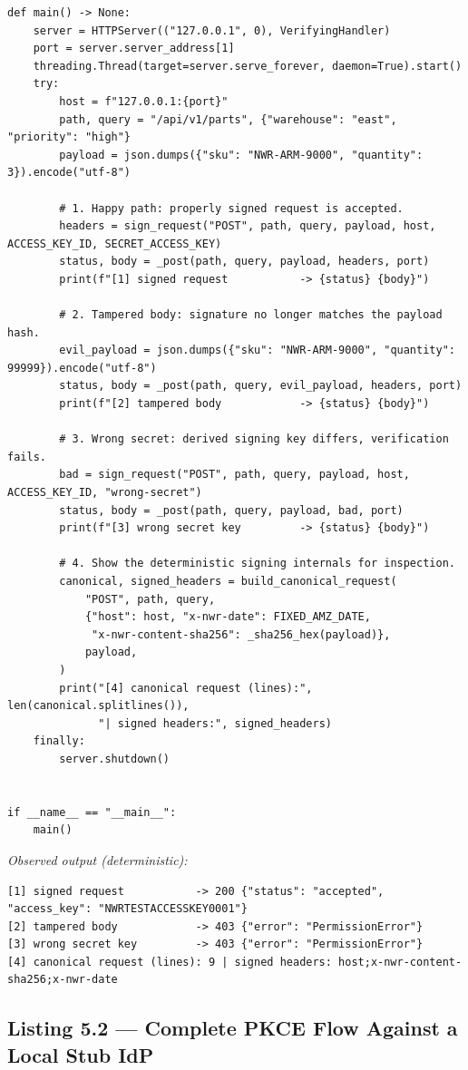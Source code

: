 \begin{verbatim}
def main() -> None:
    server = HTTPServer(("127.0.0.1", 0), VerifyingHandler)
    port = server.server_address[1]
    threading.Thread(target=server.serve_forever, daemon=True).start()
    try:
        host = f"127.0.0.1:{port}"
        path, query = "/api/v1/parts", {"warehouse": "east", "priority": "high"}
        payload = json.dumps({"sku": "NWR-ARM-9000", "quantity": 3}).encode("utf-8")

        # 1. Happy path: properly signed request is accepted.
        headers = sign_request("POST", path, query, payload, host, ACCESS_KEY_ID, SECRET_ACCESS_KEY)
        status, body = _post(path, query, payload, headers, port)
        print(f"[1] signed request           -> {status} {body}")

        # 2. Tampered body: signature no longer matches the payload hash.
        evil_payload = json.dumps({"sku": "NWR-ARM-9000", "quantity": 99999}).encode("utf-8")
        status, body = _post(path, query, evil_payload, headers, port)
        print(f"[2] tampered body            -> {status} {body}")

        # 3. Wrong secret: derived signing key differs, verification fails.
        bad = sign_request("POST", path, query, payload, host, ACCESS_KEY_ID, "wrong-secret")
        status, body = _post(path, query, payload, bad, port)
        print(f"[3] wrong secret key         -> {status} {body}")

        # 4. Show the deterministic signing internals for inspection.
        canonical, signed_headers = build_canonical_request(
            "POST", path, query,
            {"host": host, "x-nwr-date": FIXED_AMZ_DATE,
             "x-nwr-content-sha256": _sha256_hex(payload)},
            payload,
        )
        print("[4] canonical request (lines):", len(canonical.splitlines()),
              "| signed headers:", signed_headers)
    finally:
        server.shutdown()


if __name__ == "__main__":
    main()
\end{verbatim}
\noindent\emph{Observed output (deterministic):}
\begin{verbatim}
[1] signed request           -> 200 {"status": "accepted", "access_key": "NWRTESTACCESSKEY0001"}
[2] tampered body            -> 403 {"error": "PermissionError"}
[3] wrong secret key         -> 403 {"error": "PermissionError"}
[4] canonical request (lines): 9 | signed headers: host;x-nwr-content-sha256;x-nwr-date
\end{verbatim}

\subsection{Listing 5.2 --- Complete PKCE Flow Against a Local Stub IdP}
\label{lst:pkce}

